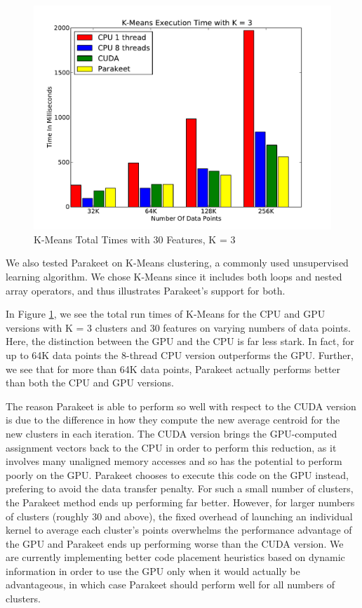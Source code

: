 \documentclass[10pt,twocolumn]{article}
\begin{document}
\begin{figure}
\includegraphics[scale=0.4]{KMCPUK3.pdf}
\caption{K-Means Total Times with 30 Features, K = 3}
\label{KMCPU3}
\end{figure}

We also tested Parakeet on K-Means clustering, a commonly used unsupervised learning algorithm.  We chose K-Means since it includes both loops and nested array operators, and thus illustrates Parakeet's support for both.

In Figure \ref{KMCPU3}, we see the total run times of K-Means for the CPU and GPU versions with K = 3 clusters and 30 features on varying numbers of data points.  Here, the distinction between the GPU and the CPU is far less stark.  In fact, for up to 64K data points the 8-thread CPU version outperforms the GPU.  Further, we see that for more than 64K data points, Parakeet actually performs better than both the CPU and GPU versions.

The reason Parakeet is able to perform so well with respect to the CUDA version is due to the difference in how they compute the new average centroid for the new clusters in each iteration.  The CUDA version brings the GPU-computed assignment vectors back to the CPU in order to perform this reduction, as it involves many unaligned memory accesses and so has the potential to perform poorly on the GPU.  Parakeet chooses to execute this code on the GPU instead, prefering to avoid the data transfer penalty.  For such a small number of clusters, the Parakeet method ends up performing far better.  However, for larger numbers of clusters (roughly 30 and above), the fixed overhead of launching an individual kernel to average each cluster's points overwhelms the performance advantage of the GPU and Parakeet ends up performing worse than the CUDA version.  We are currently implementing better code placement heuristics based on dynamic information in order to use the GPU only when it would actually be advantageous, in which case Parakeet should perform well for all numbers of clusters.
\end{document}
